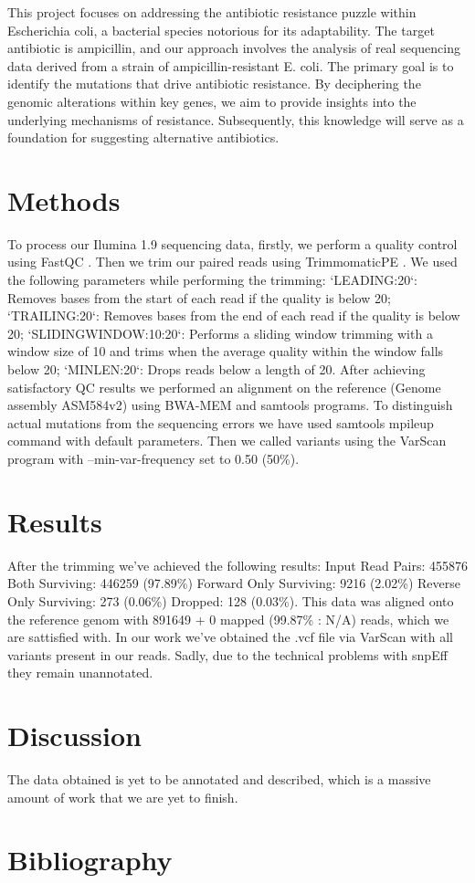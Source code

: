 \documentclass{article}
\begin{document}
This project focuses on addressing the antibiotic resistance puzzle within Escherichia coli, a bacterial species notorious for its adaptability. The target antibiotic is ampicillin, and our approach involves the analysis of real sequencing data derived from a strain of ampicillin-resistant E. coli. The primary goal is to identify the mutations that drive antibiotic resistance. By deciphering the genomic alterations within key genes, we aim to provide insights into the underlying mechanisms of resistance. Subsequently, this knowledge will serve as a foundation for suggesting alternative antibiotics.

\section{Methods}
To process our Ilumina 1.9 sequencing data, firstly, we perform a quality control using FastQC \cite{andrews2012}. Then we trim our paired reads using TrimmomaticPE \cite{bolger_trimmomatic_2014}. We used the following parameters while performing the trimming: `LEADING:20`: Removes bases from the start of each read if the quality is below 20; `TRAILING:20`: Removes bases from the end of each read if the quality is below 20; `SLIDINGWINDOW:10:20`: Performs a sliding window trimming with a window size of 10 and trims when the average quality within the window falls below 20; `MINLEN:20`: Drops reads below a length of 20. 
After achieving satisfactory QC results we performed an alignment on the reference (Genome assembly ASM584v2) using BWA-MEM \cite{li2009fast} and samtools \cite {danecek_twelve_2021} programs. To distinguish actual mutations from the sequencing errors we have used samtools mpileup command with default parameters. Then we called variants using the VarScan program \cite{koboldt_varscan_2009} with --min-var-frequency set to 0.50 (50\%).

\section{Results}
After the trimming we've achieved the following results: Input Read Pairs: 455876 Both Surviving: 446259 (97.89\%) Forward Only Surviving: 9216 (2.02\%) Reverse Only Surviving: 273 (0.06\%) Dropped: 128 (0.03\%). This data was aligned onto the reference genom with 891649 + 0 mapped (99.87\% : N/A) reads, which we are sattisfied with.
In our work we've obtained the .vcf file via VarScan with all variants present in our reads. Sadly, due to the technical problems with snpEff they remain unannotated.

\section{Discussion}
The data obtained is yet to be annotated and described, which is a massive amount of work that we are yet to finish. 

\newpage
\section{Bibliography}


\end{document}
